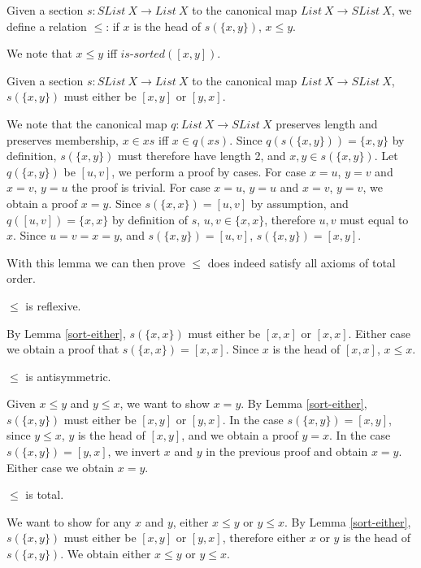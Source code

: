 \documentclass{article}
\begin{document}
\begin{mydef}
    Given a section $s : SList \: X \rightarrow List \: X$ to the canonical map $List \: X \rightarrow SList \: X$,
    we define a relation $\leq$: if $x$ is the head of $s(\{x, y\})$, $x \leq y$.
\end{mydef}

    We note that $x \leq y$ iff $\textit{is-sorted}([x, y])$.

\begin{mylemma}
    \label{sort-either}
    Given a section $s : SList \: X \rightarrow List \: X$ to the canonical map $List \: X \rightarrow SList \: X$,
    $s(\{x, y\})$ must either be $[x, y]$ or $[y, x]$.
\end{mylemma}

We note that the canonical map $q : List \: X \rightarrow SList \: X$ preserves length and preserves membership, $x \in xs$ iff $x \in q(xs)$.
Since $q(s(\{x, y\})) = \{x, y\}$ by definition, $s(\{x,y\})$ must therefore have length 2, and $x, y \in s(\{x, y\})$.
Let $q(\{x, y\})$ be $[u, v]$, we perform a proof by cases. For case $x = u$, $y = v$ and $x = v$, $y = u$ the proof is trivial.
For case $x = u$, $y = u$ and $x = v$, $y = v$, we obtain a proof $x = y$. Since $s(\{x, x\}) = [u , v]$ by assumption,
and $q([u, v]) = \{x, x\}$ by definition of $s$, $u, v \in \{x, x\}$, therefore $u, v$ must equal to $x$.
Since $u = v = x = y$, and $s(\{x, y\}) = [u, v]$, $s(\{x, y\}) = [x, y]$.

With this lemma we can then prove $\leq$ does indeed satisfy all axioms of total order.

\begin{mythm}
    $\leq$ is reflexive.
\end{mythm}
    By Lemma \ref{sort-either}, $s(\{x, x\})$ must either be $[x, x]$ or $[x ,x]$. Either case we obtain a proof that
    $s(\{x, x\}) = [x, x]$. Since $x$ is the head of $[x, x]$, $x \leq x$.

\begin{mythm}
    $\leq$ is antisymmetric.
\end{mythm}
    Given $x \leq y$ and $y \leq x$, we want to show $x = y$.
    By Lemma \ref{sort-either}, $s(\{x, y\})$ must either be $[x, y]$ or $[y, x]$. In the case $s(\{x, y\}) = [x, y]$,
    since $y \leq x$, $y$ is the head of $[x, y]$, and we obtain a proof $y = x$. In the case $s(\{x, y\}) = [y, x]$,
    we invert $x$ and $y$ in the previous proof and obtain $x = y$. Either case we obtain $x = y$.

\begin{mythm}
    $\leq$ is total.
\end{mythm}
    We want to show for any $x$ and $y$, either $x \leq y$ or $y \leq x$.
    By Lemma \ref{sort-either}, $s(\{x, y\})$ must either be $[x, y]$ or $[y, x]$, therefore either $x$ or $y$
    is the head of $s(\{x, y\})$. We obtain either $x \leq y$ or $y \leq x$.
\end{document}

